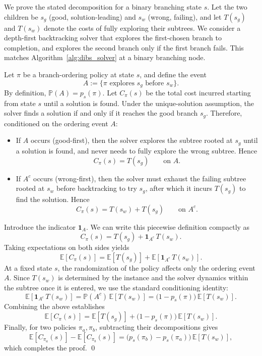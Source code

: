 \documentclass[lettersize,journal]{IEEEtran}
\begin{document}
We prove the stated decomposition for a binary branching state $s$.
Let the two children be $s_g$ (good, solution-leading) and $s_w$ (wrong, failing), and
let  $T(s_g)$ and $T(s_w)$ denote the costs of fully exploring their subtrees.
We consider a depth-first backtracking solver that explores the first-chosen branch to completion,
and explores the second branch only if the first branch fails.
This matches Algorithm~\ref{alg:dibs_solver} at a binary branching node.

Let $\pi$ be a branch-ordering policy at state $s$, and define the event
\[
A := \{\pi \text{ explores } s_g \text{ before } s_w\}.
\]
By definition, $\mathbb{P}(A)=p_s(\pi)$.
Let $C_\pi(s)$ be the total cost incurred starting from state $s$ until a solution is found.
Under the unique-solution assumption, the solver finds a solution if and only if it reaches
the good branch $s_g$.
Therefore, conditioned on the ordering event $A$:
\begin{itemize}
	\item If $A$ occurs (good-first), then the solver explores the subtree rooted at $s_g$
	until a solution is found, and never needs to fully explore the wrong subtree. Hence
	\[
	C_\pi(s) = T(s_g) \qquad \text{on } A.
	\]
	\item If $A^c$ occurs (wrong-first), then the solver must exhaust the failing subtree rooted at $s_w$
	before backtracking to try $s_g$, after which it incurs $T(s_g)$ to find the solution. Hence
	\[
	C_\pi(s) = T(s_w) + T(s_g) \qquad \text{on } A^c.
	\]
\end{itemize}
Introduce the indicator $\mathbf{1}_A$. We can write this piecewise definition compactly as
\[
C_\pi(s) = T(s_g) + \mathbf{1}_{A^c}\,T(s_w).
\]
Taking expectations on both sides yields
\[
\mathbb{E}[C_\pi(s)]
=
\mathbb{E}[T(s_g)] + \mathbb{E}\!\left[\mathbf{1}_{A^c}\,T(s_w)\right].
\]
At a fixed state $s$, the randomization of the policy affects only the ordering event $A$.
Since $T(s_w)$ is determined by the instance and the solver dynamics within the subtree once it is entered,
we use the standard conditioning identity:
\[
\mathbb{E}\!\left[\mathbf{1}_{A^c}\,T(s_w)\right]
=
\mathbb{P}(A^c)\,\mathbb{E}[T(s_w)]
=
\bigl(1-p_s(\pi)\bigr)\,\mathbb{E}[T(s_w)].
\]
Combining the above establishes
\[
\mathbb{E}[C_\pi(s)]
=
\mathbb{E}[T(s_g)] + \bigl(1-p_s(\pi)\bigr)\,\mathbb{E}[T(s_w)].
\]
Finally, for two policies $\pi_a,\pi_b$, subtracting their decompositions gives
\[
\mathbb{E}[C_{\pi_a}(s)]-\mathbb{E}[C_{\pi_b}(s)]
=
\bigl(p_s(\pi_b)-p_s(\pi_a)\bigr)\,\mathbb{E}[T(s_w)],
\]
which completes the proof.
\qed
\end{document}
